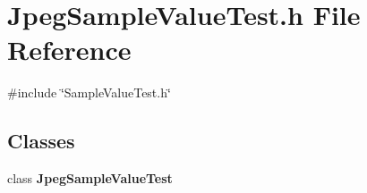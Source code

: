 \section{Jpeg\+Sample\+Value\+Test.\+h File Reference}
\label{JpegSampleValueTest_8h}
{\ttfamily \#include \char`\"{}Sample\+Value\+Test.\+h\char`\"{}}\newline
\subsection*{Classes}
\begin{DoxyCompactItemize}
\item 
class \textbf{ Jpeg\+Sample\+Value\+Test}
\end{DoxyCompactItemize}
